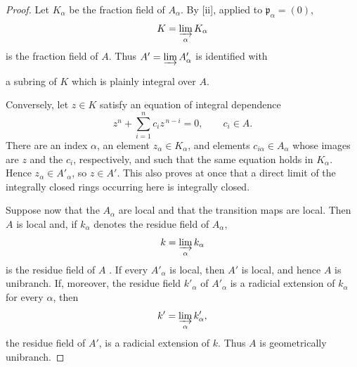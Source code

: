\begin{proof}
Let $K_\alpha$ be the fraction field of $A_\alpha$.  By
[ii], applied to $\mathfrak p_\alpha=(0)$,
\[
  K=\varinjlim_\alpha K_\alpha
\]
is the fraction field of $A$.  Thus
$A'=\varinjlim A'_\alpha$ is identified with


a subring of $K$ which is plainly integral over $A$.

Conversely, let $z\in K$ satisfy an equation of integral
dependence
\[
  z^n+\sum_{i=1}^{n}c_i z^{\,n-i}=0,
  \qquad c_i\in A.
\]
There are an index $\alpha$, an element $z_\alpha\in K_\alpha$,
and elements $c_{i\alpha}\in A_\alpha$ whose images are
$z$ and the $c_i$, respectively, and such that the same equation
holds in $K_\alpha$.  Hence $z_\alpha\in A'_\alpha$, so
$z\in A'$.  This also proves at once that a direct limit of the
integrally closed rings occurring here is integrally closed.

Suppose now that the $A_\alpha$ are local and that the transition
maps are local.  Then $A$ is local and, if $k_\alpha$ denotes the
residue field of $A_\alpha$,
\[
  k=\varinjlim_\alpha k_\alpha
\]
is the residue field of $A$ .  If every
$A'_\alpha$ is local, then $A'$ is local, and hence $A$ is
unibranch.  If, moreover, the residue field $k'_\alpha$ of
$A'_\alpha$ is a radicial extension of $k_\alpha$ for every
$\alpha$, then
\[
  k'=\varinjlim_\alpha k'_\alpha,
\]
the residue field of $A'$, is a radicial extension of $k$.
Thus $A$ is geometrically unibranch.
\end{proof}
